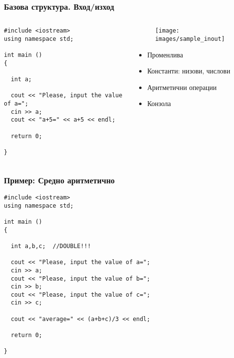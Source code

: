 \documentclass{beamer}
\begin{document}
\begin{frame}[fragile]
\frametitle{Базова структура. Вход/изход}

\begin{columns}[t]
  \begin{column}{0.2\textwidth}
\begin{lstlisting}
#include <iostream>
using namespace std;

int main ()
{

  int a;

  cout << "Please, input the value of a=";
  cin >> a;
  cout << "a+5=" << a+5 << endl;

  return 0;

}
\end{lstlisting}

  \end{column}
  \begin{column}{0.8\textwidth}
\begin{figure}
\flushright
\texttt{[image: images/sample\_inout]}
\end{figure}
\begin{itemize}
\item Променлива
\item Константи: низови, числови
\item Аритметични операции
\item Конзола
\end{itemize}

  \end{column}
\end{columns}


\end{frame}

\begin{frame}[fragile]
\frametitle{Пример: Средно аритметично}

\begin{lstlisting}
#include <iostream>
using namespace std;

int main ()
{

  int a,b,c;  //DOUBLE!!!

  cout << "Please, input the value of a=";
  cin >> a;
  cout << "Please, input the value of b=";
  cin >> b;
  cout << "Please, input the value of c=";
  cin >> c;

  cout << "average=" << (a+b+c)/3 << endl;

  return 0;

}
\end{lstlisting}

\end{frame}
\end{document}
